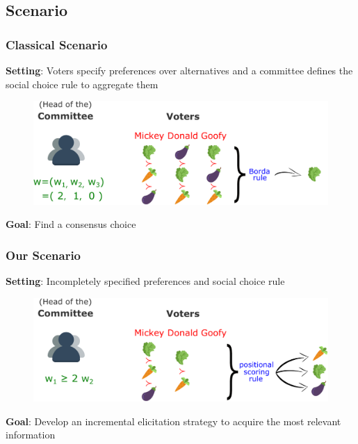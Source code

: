 \documentclass{beamer}
\begin{document}
\subsection{Scenario}

\begin{frame}[t]
	\frametitle{Classical Scenario}
	\textbf{Setting}: Voters specify preferences over alternatives and a committee defines the social choice rule to aggregate them
	\begin{figure}
		\includegraphics[scale=0.35]{classset.png}
	\end{figure}
	 \textbf{Goal}: Find a consensus choice 
\end{frame}

\begin{frame}[t]
\frametitle{Our Scenario}
\textbf{Setting}: Incompletely specified preferences and social choice rule \bigskip
\begin{figure}
	\includegraphics[scale=0.35]{ourset.png}
\end{figure}
 \textbf{Goal}: Develop an incremental elicitation strategy to acquire the most relevant information 
\end{frame}
\end{document}
